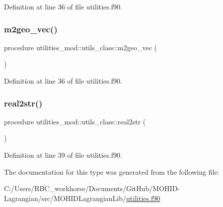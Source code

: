 Definition at line 36 of file utilities.\+f90.

\mbox{\label{structutilities__mod_1_1utils__class_a8319bf9d14dd225be0f30f5e0c1f04e3}} 
\subsubsection{\texorpdfstring{m2geo\+\_\+vec()}{m2geo\_vec()}}
{\footnotesize\ttfamily procedure utilities\+\_\+mod\+::utils\+\_\+class\+::m2geo\+\_\+vec (\begin{DoxyParamCaption}{ }\end{DoxyParamCaption})\hspace{0.3cm}{\ttfamily [private]}}



Definition at line 36 of file utilities.\+f90.

\mbox{\label{structutilities__mod_1_1utils__class_a150e3763affd525139f135d6cbbca026}} 
\subsubsection{\texorpdfstring{real2str()}{real2str()}}
{\footnotesize\ttfamily procedure utilities\+\_\+mod\+::utils\+\_\+class\+::real2str (\begin{DoxyParamCaption}{ }\end{DoxyParamCaption})\hspace{0.3cm}{\ttfamily [private]}}



Definition at line 39 of file utilities.\+f90.



The documentation for this type was generated from the following file\+:\begin{DoxyCompactItemize}
\item 
C\+:/\+Users/\+R\+B\+C\+\_\+workhorse/\+Documents/\+Git\+Hub/\+M\+O\+H\+I\+D-\/\+Lagrangian/src/\+M\+O\+H\+I\+D\+Lagrangian\+Lib/\mbox{\hyperlink{utilities_8f90}{utilities.\+f90}}\end{DoxyCompactItemize}
